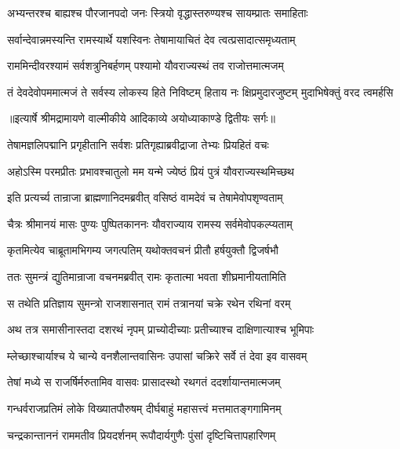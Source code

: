 \twolineshloka
{अभ्यन्तरश्च बाह्यश्च पौरजानपदो जनः}
{स्त्रियो वृद्धास्तरुण्यश्च सायम्प्रातः समाहिताः} %

\twolineshloka
{सर्वान्देवान्नमस्यन्ति रामस्यार्थे यशस्विनः}
{तेषामायाचितं देव त्वत्प्रसादात्समृध्यताम्} %

\twolineshloka
{राममिन्दीवरश्यामं सर्वशत्रुनिबर्हणम्}
{पश्यामो यौवराज्यस्थं तव राजोत्तमात्मजम्} %

\fourlineindentedshloka
{तं देवदेवोपममात्मजं ते}
{सर्वस्य लोकस्य हिते निविष्टम्}
{हिताय नः क्षिप्रमुदारजुष्टम्}
{मुदाभिषेक्तुं वरद त्वमर्हसि} %


{॥इत्यार्षे श्रीमद्रामायणे वाल्मीकीये आदिकाव्ये अयोध्याकाण्डे द्वितीयः सर्गः॥}


\twolineshloka
{तेषामज्ञलिपद्मानि प्रगृहीतानि सर्वशः}
{प्रतिगृह्याब्रवीद्राजा तेभ्यः प्रियहितं वचः} %

\twolineshloka
{अहोऽस्मि परमप्रीतः प्रभावश्चातुलो मम}
{यन्मे ज्येष्ठं प्रियं पुत्रं यौवराज्यस्थमिच्छथ} %

\twolineshloka
{इति प्रत्यर्च्य तान्राजा ब्राह्मणानिदमब्रवीत्}
{वसिष्ठं वामदेवं च तेषामेवोपशृण्वताम्} %

\twolineshloka
{चैत्रः श्रीमानयं मासः पुण्यः पुष्पितकाननः}
{यौवराज्याय रामस्य सर्वमेवोपकल्प्यताम्} %

\twolineshloka
{कृतमित्येव चाब्रूतामभिगम्य जगत्पतिम्}
{यथोक्तवचनं प्रीतौ हर्षयुक्तौ द्विजर्षभौ} %

\twolineshloka
{ततः सुमन्त्रं द्युतिमान्राजा वचनमब्रवीत्}
{रामः कृतात्मा भवता शीघ्रमानीयतामिति} %

\twolineshloka
{स तथेति प्रतिज्ञाय सुमन्त्रो राजशासनात्}
{रामं तत्रानयां चक्रे रथेन रथिनां वरम्} %

\twolineshloka
{अथ तत्र समासीनास्तदा दशरथं नृपम्}
{प्राच्योदीच्याः प्रतीच्याश्च दाक्षिणात्याश्च भूमिपाः} %

\twolineshloka
{म्लेच्छाश्चार्याश्च ये चान्ये वनशैलान्तवासिनः}
{उपासां चक्रिरे सर्वे तं देवा इव वासवम्} %

\twolineshloka
{तेषां मध्ये स राजर्षिर्मरुतामिव वासवः}
{प्रासादस्थो रथगतं ददर्शायान्तमात्मजम्} %

\twolineshloka
{गन्धर्वराजप्रतिमं लोके विख्यातपौरुषम्}
{दीर्घबाहुं महासत्त्वं मत्तमातङ्गगामिनम्} %

\twolineshloka
{चन्द्रकान्ताननं राममतीव प्रियदर्शनम्}
{रूपौदार्यगुणैः पुंसां दृष्टिचित्तापहारिणम्} %

